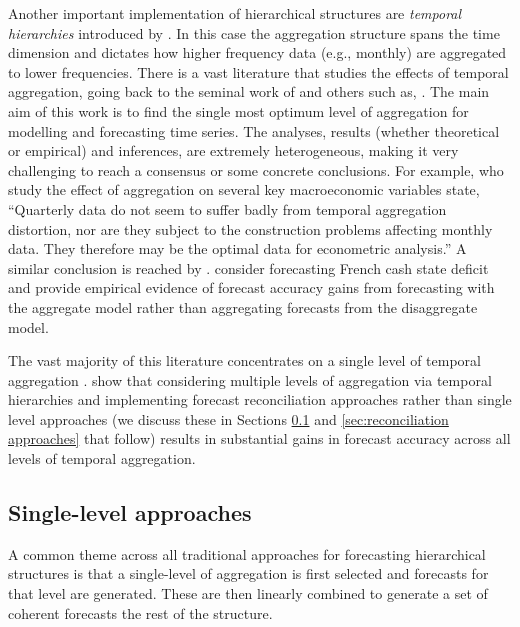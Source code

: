 \documentclass[graybox]{svmult}
\begin{document}
Another important implementation of hierarchical structures are \textit{temporal hierarchies} introduced by \cite{AthEtAl2017}. In this case the aggregation structure spans the time dimension and dictates how higher frequency data (e.g., monthly) are aggregated to lower frequencies. There is a vast literature that studies the effects of temporal aggregation, going back to the seminal work of \cite{ZelMon1971, AmeWu1972, Tia1972, Bre1973} and others such as, \cite{Hot1993, HotCar1993, Mar1999, SilEtAl2008}. The main aim of this work is to find the single most optimum level of aggregation for modelling and forecasting time series. The analyses, results (whether theoretical or empirical) and inferences, are extremely heterogeneous, making it very challenging to reach a consensus or some concrete conclusions. For example, \cite{RosSea1995} who study the effect of aggregation on several key macroeconomic variables state, ``Quarterly data do not seem to suffer badly from temporal aggregation distortion, nor are they subject to the construction problems affecting monthly data. They therefore may be the optimal data for econometric analysis.'' A similar conclusion is reached by \cite{NijPal1990}. \cite{SilEtAl2008} consider forecasting French cash state deficit and provide empirical evidence of forecast accuracy gains from forecasting with the aggregate model rather than aggregating forecasts from the disaggregate model.

The vast majority of this literature concentrates on a single level of temporal aggregation \citep[there are some notable exceptions such as,][]{AndEtAl2011,KouEtAl2014}. \cite{AthEtAl2017} show that considering multiple levels of aggregation via temporal hierarchies and implementing forecast reconciliation approaches rather than single level approaches (we discuss these in Sections \ref{sec:single level approaches} and \ref{sec:reconciliation approaches} that follow) results in substantial gains in forecast accuracy across all levels of temporal aggregation.

\subsection{Single-level approaches}\label{sec:single level approaches}
A common theme across all traditional approaches for forecasting hierarchical structures is that a single-level of aggregation is first selected and forecasts for that level are generated. These are then linearly combined to generate a set of coherent forecasts the rest of the structure.
\end{document}
